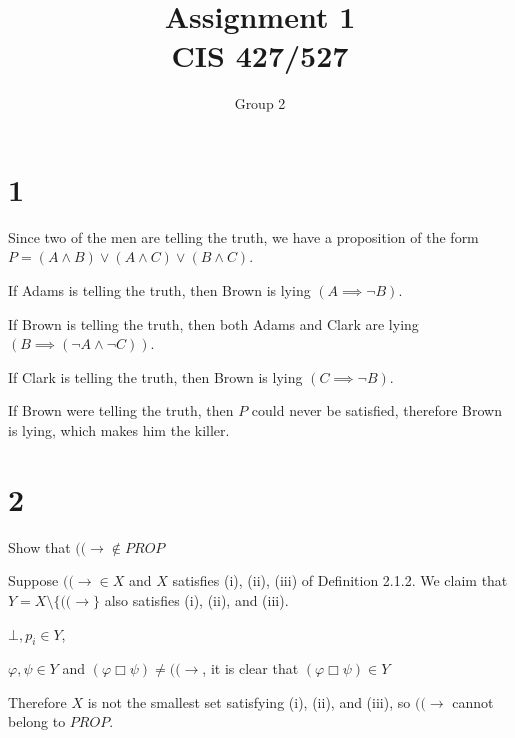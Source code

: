 \documentclass[10pt]{article}
\begin{document}
\title{Assignment \raisebox{.22ex}{\large\#}1 \\
	CIS 427/527}
\author{Group 2}

\maketitle


\section*{1}
Since two of the men are telling the truth, we have a proposition of the form $P = (A \land B) \lor (A \land C) \lor (B \land C)$. 
\begin{itemize*}
\item If Adams is telling the truth, then Brown is lying $(A\implies \lnot B)$.
\item If Brown is telling the truth, then both Adams and Clark are lying $(B\implies (\lnot A \land \lnot C))$.
\item If Clark is telling the truth, then Brown is lying $(C\implies \lnot B)$.
\end{itemize*}

\noindent If Brown were telling the truth, then $P$ could never be satisfied, therefore Brown is lying, which makes him the killer.


\section*{2}
\begin{description*}
	\item[2.] Show that $(( \to \notin PROP$
\end{description*}

\noindent Suppose $(( \to \in X$ and $X$ satisfies (i), (ii), (iii) of Definition 2.1.2. We claim that $Y = X\text{\textbackslash} \{ ((\to \}$ also satisfies (i), (ii), and (iii). 
\begin{description*}
\item[\hspace{2em}(i)] $\bot, p_i \in Y$, 
\item[\hspace{2em}(ii)] $\varphi , \psi \in Y$ and $(\varphi \Box \psi) \neq ((\to $, it is clear that $(\varphi \Box \psi) \in Y $
\item[\hspace{2em}(iii)]
\end{description*}
Therefore $X$ is not the smallest set satisfying (i), (ii), and (iii), so $((\to $ cannot belong to $PROP$.
\end{document}
